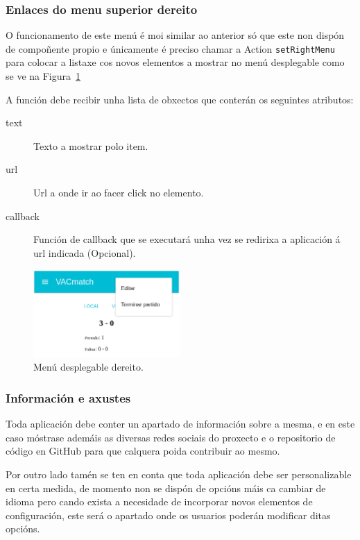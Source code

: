       \subsubsection{Enlaces do menu superior dereito}
      O funcionamento de este menú é moi similar ao anterior só que este 
non dispón de compoñente propio e únicamente é preciso chamar a Action 
\lstinline{setRightMenu} para colocar a listaxe cos novos elementos a mostrar 
no menú desplegable como se ve na Figura~\ref{fig:design:rightmenu}

      A función debe recibir unha lista de obxectos que conterán os 
seguintes atributos:

      \begin{description}
       \item [text] Texto a mostrar polo item.
       \item [url] Url a onde ir ao facer click no elemento.
       \item [callback] Función de callback que se executará unha vez se 
redirixa a aplicación á url indicada (Opcional).
      \end{description}

      \begin{figure}[h!]
        \begin{center}
        \includegraphics[width=0.5\textwidth]{./img/demo/2_right_menu.png}
        \caption{Menú desplegable dereito.}
        \label{fig:design:rightmenu}
        \end{center}
      \end{figure}


      \subsubsection{Información e axustes}
      Toda aplicación debe conter un apartado de información sobre a mesma, e 
en este caso móstrase ademáis as diversas redes sociais do proxecto e o 
repositorio de código en GitHub para que calquera poida contribuir ao mesmo.

      Por outro lado tamén se ten en conta que toda aplicación debe ser 
personalizable en certa medida, de momento non se dispón de opcións máis ca 
cambiar de idioma pero cando exista a necesidade de incorporar 
novos elementos de configuración, este será o apartado onde os usuarios poderán 
modificar ditas opcións.

